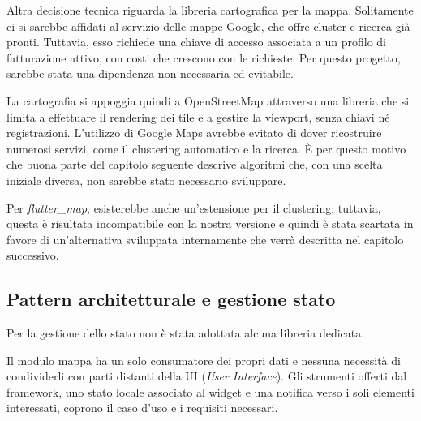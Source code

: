 Altra decisione tecnica riguarda la libreria cartografica per la mappa.
Solitamente ci si sarebbe affidati al servizio delle mappe Google, che offre cluster e ricerca già pronti.
Tuttavia, esso richiede una chiave di accesso associata a un profilo di fatturazione attivo, con costi che crescono con le richieste.
Per questo progetto, sarebbe stata una dipendenza non necessaria ed evitabile.

La cartografia si appoggia quindi a OpenStreetMap attraverso una libreria che si limita a effettuare il rendering dei tile e
a gestire la viewport, senza chiavi né registrazioni.
L'utilizzo di Google Maps avrebbe evitato di dover ricostruire numerosi servizi, come il clustering automatico e la ricerca.
È per questo motivo che buona parte del capitolo seguente descrive algoritmi che, con una scelta iniziale diversa, non sarebbe
stato necessario sviluppare.

Per \textit{flutter\_map}, esisterebbe anche un'estensione per il clustering; tuttavia, questa è risultata incompatibile con la nostra versione
e quindi è stata scartata in favore di un'alternativa sviluppata internamente che verrà descritta nel capitolo successivo.


\subsection{Pattern architetturale e gestione stato}\label{subsec:gestione-stato}

Per la gestione dello stato non è stata adottata alcuna libreria dedicata.

Il modulo mappa ha un solo consumatore dei propri dati e nessuna necessità di condividerli con parti distanti della UI (\textit{User Interface}).
Gli strumenti offerti dal framework, uno stato locale associato al widget e una notifica verso i soli elementi interessati,
coprono il caso d'uso e i requisiti necessari.

